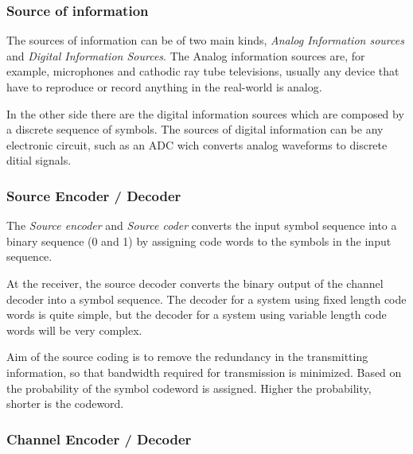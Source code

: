 \subsubsection{Source of information}

The sources of information can be of two main kinds, \emph{Analog Information
sources} and \emph{Digital Information Sources}. The Analog information sources
are, for example, microphones and cathodic ray tube televisions, usually any
device that have to reproduce or record anything in the real-world is analog.

In the other side there are the digital information sources which are composed
by a discrete sequence of symbols. The sources of digital information can be any
electronic circuit, such as an ADC wich converts analog waveforms to discrete
ditial signals.

\subsubsection{Source Encoder / Decoder}

The \emph{Source encoder}  and \emph{Source coder} converts the input symbol
sequence into a binary sequence (0 and 1) by assigning code words to the symbols
in the input sequence.


At the receiver, the source decoder converts the binary output of the channel
decoder into a symbol sequence. The decoder for a system using fixed length code
words is quite simple, but the decoder for a system using variable length code
words will be very complex.

Aim of the source coding is to remove the redundancy in the transmitting
information, so that bandwidth required for transmission is minimized. Based on
the probability of the symbol codeword is assigned. Higher the probability,
shorter is the codeword.

\subsubsection{Channel Encoder / Decoder}

